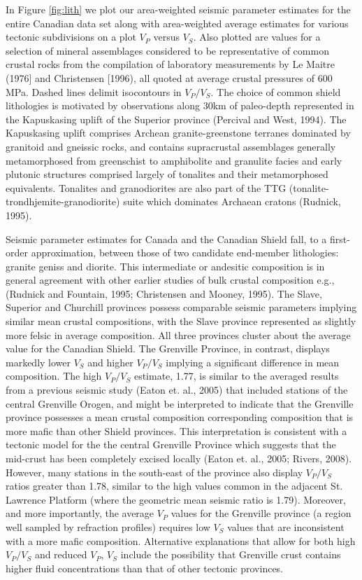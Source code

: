 \documentclass[review]{elsarticle}
\begin{document}
In Figure \ref{fig:lith} we plot our area-weighted seismic parameter estimates for the entire Canadian data set along with area-weighted average estimates for various tectonic subdivisions on a plot $V_P$ versus $V_S$. Also plotted are values for a selection of mineral assemblages considered to be representative of common crustal rocks from the compilation of laboratory measurements by Le Maitre (1976] and Christensen [1996), all quoted at average crustal pressures of 600 MPa. Dashed lines delimit isocontours in $V_P/V_S$. The choice of common shield lithologies is motivated by observations along 30km of paleo-depth represented in the Kapuskasing uplift of the Superior province (Percival and West, 1994). The Kapuskasing uplift comprises Archean granite-greenstone terranes dominated by granitoid and gneissic rocks, and contains supracrustal assemblages generally metamorphosed from greenschist to amphibolite and granulite facies and early plutonic structures comprised largely of tonalites and their metamorphosed equivalents. Tonalites and granodiorites are also part of the TTG (tonalite-trondhjemite-granodiorite) suite which dominates Archaean cratons (Rudnick, 1995).

Seismic parameter estimates for Canada and the Canadian Shield fall, to a first-order approximation, between those of two candidate end-member lithologies: granite geniss and diorite. This intermediate or andesitic composition is in general agreement with other earlier studies of bulk crustal composition e.g., (Rudnick and Fountain, 1995; Christensen and Mooney, 1995). The Slave, Superior and Churchill provinces possess comparable seismic parameters implying similar mean crustal compositions, with the Slave province represented as slightly more felsic in average composition. All three provinces cluster about the average value for the Canadian Shield. The Grenville Province, in contrast, displays markedly lower $V_S$ and higher $V_P/V_S$ implying a significant difference in mean composition. The high $V_P/V_S$ estimate, 1.77, is similar to the averaged results from a previous seismic study (Eaton et. al., 2005) that included stations of the central Grenville Orogen, and might be interpreted to indicate that the Grenville province possesses a mean crustal composition corresponding composition that is more mafic than other Shield provinces. This interpretation is consistent with a tectonic model for the the central Grenville Province which suggests that the mid-crust has been completely excised locally (Eaton et. al., 2005; Rivers, 2008). However, many stations in the south-east of the province also display $V_P/V_S$ ratios greater than 1.78, similar to the high values common in the adjacent St. Lawrence Platform (where the geometric mean seismic ratio is 1.79). Moreover, and more importantly, the average $V_P$ values for the Grenville province (a region well sampled by refraction profiles) requires low $V_S$ values that are inconsistent with a more mafic composition. Alternative explanations that allow for both high $V_P/V_S$ and reduced $V_P$, $V_S$ include the possibility that Grenville crust contains higher fluid concentrations than that of other tectonic provinces.
\end{document}
